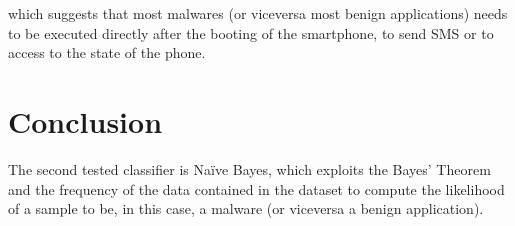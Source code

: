 \documentclass[paper=a4, fontsize=11pt]{scrartcl} %
\numberwithin{equation}{section} %
\numberwithin{figure}{section} %
\numberwithin{table}{section} %
\theoremstyle{definition}
\begin{document}
\noindent which suggests that most malwares (or viceversa most benign applications)
needs to be executed directly after the booting of the smartphone, to send SMS or
to access to the state of the phone.




\section{Conclusion}

The second tested classifier is Na\"ive Bayes, which exploits the Bayes' Theorem
and the frequency of the data contained in the dataset to compute the likelihood
of a sample to be, in this case, a malware (or viceversa a benign application).
\end{document}
